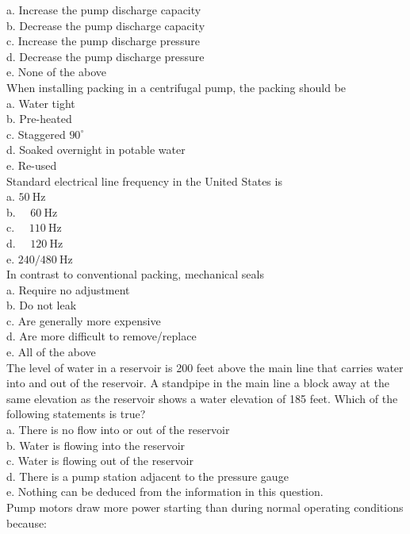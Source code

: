 a. Increase the pump discharge capacity\\
b. Decrease the pump discharge capacity\\
c. Increase the pump discharge pressure\\
d. Decrease the pump discharge pressure\\
e. None of the above\\
When installing packing in a centrifugal pump, the packing should be\\
a. Water tight\\
b. Pre-heated\\
c. Staggered $90^{\circ}$\\
d. Soaked overnight in potable water\\
e. Re-used\\
  Standard electrical line frequency in the United States is\\
a. $50 \mathrm{~Hz}$\\
b. $\quad 60 \mathrm{~Hz}$\\
c. $\quad 110 \mathrm{~Hz}$\\
d. $\quad 120 \mathrm{~Hz}$\\
e. $240 / 480 \mathrm{~Hz}$\\
In contrast to conventional packing, mechanical seals\\
a. Require no adjustment\\
b. Do not leak\\
c. Are generally more expensive\\
d. Are more difficult to remove/replace\\
e. All of the above\\
The level of water in a reservoir is 200 feet above the main line that carries water into and out of the reservoir. A standpipe in the main line a block away at the same elevation as the reservoir shows a water elevation of 185 feet. Which of the following statements is true?\\
a. There is no flow into or out of the reservoir\\
b. Water is flowing into the reservoir\\
c. Water is flowing out of the reservoir\\
d. There is a pump station adjacent to the pressure gauge\\
e. Nothing can be deduced from the information in this question.\\
Pump motors draw more power starting than during normal operating conditions because:\\
